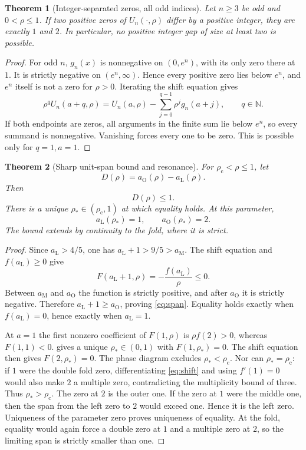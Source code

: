 \documentclass[11pt]{article}
\numberwithin{equation}{section}
\newtheorem{theorem}{Theorem}[section]
\theoremstyle{definition}
\newcommand{\N}{\mathbb N}
\newcommand{\lc}{\rho_{\mathrm c}}
\newcommand{\rs}{\rho_*}
\newcommand{\aL}{a_{\mathrm L}}
\newcommand{\aM}{a_{\mathrm M}}
\newcommand{\aO}{a_{\mathrm O}}
\begin{document}
\begin{theorem}[Integer-separated zeros, all odd indices]\label{thm:integergap}
Let $n\geq3$ be odd and $0<\rho\leq1$. If two positive zeros of
$U_n(\cdot,\rho)$ differ by a positive integer, they are exactly $1$ and $2$.
In particular, no positive integer gap of size at least two is possible.
\end{theorem}
\begin{proof}
For odd $n$, $g_n(x)$ is nonnegative on $(0,e^n)$, with its only zero there
at $1$. It is strictly negative on $(e^n,\infty)$. Hence every positive
zero lies below $e^n$, and $e^n$ itself is not a zero for $\rho>0$.
Iterating the shift equation gives
\[
 \rho^q U_n(a+q,\rho)=U_n(a,\rho)-
             \sum_{j=0}^{q-1}\rho^j g_n(a+j),\qquad q\in\N.
\]
If both endpoints are zeros, all arguments in the finite sum lie below
$e^n$, so every summand is nonnegative. Vanishing forces every one to be
zero. This is possible only for $q=1,a=1$.
\end{proof}

\begin{theorem}[Sharp unit-span bound and resonance]\label{thm:span}
For $\lc<\rho\leq1$, let
\[
 D(\rho)=\aO(\rho)-\aL(\rho).
\]
Then
\begin{equation}\label{eq:span}
 D(\rho)\leq1.
\end{equation}
There is a unique $\rs\in(\lc,1)$ at which equality holds. At this parameter,
\begin{equation}\label{eq:lockedzeros}
 \aL(\rs)=1,\qquad \aO(\rs)=2.
\end{equation}
The bound extends by continuity to the fold, where it is strict.
\end{theorem}
\begin{proof}
Since $\aL>4/5$, one has $\aL+1>9/5>\aM$.
The shift equation and $f(\aL)\geq0$ give
\[
 F(\aL+1,\rho)=-\frac{f(\aL)}{\rho}\leq0.
\]
Between $\aM$ and $\aO$ the function is strictly positive, and after
$\aO$ it is strictly negative. Therefore $\aL+1\geq\aO$, proving
\eqref{eq:span}. Equality holds exactly when $f(\aL)=0$, hence exactly
when $\aL=1$.

At $a=1$ the first nonzero coefficient of $F(1,\rho)$ is
$\rho f(2)>0$, whereas $F(1,1)<0$.  gives a unique
$\rs\in(0,1)$ with $F(1,\rs)=0$. The shift equation then gives
$F(2,\rs)=0$. The phase diagram excludes $\rs<\lc$.
Nor can $\rs=\lc$: if $1$ were the double fold zero, differentiating
\eqref{eq:shift} and using $f'(1)=0$ would also make $2$ a multiple zero,
contradicting the multiplicity bound of three. Thus $\rs>\lc$.
The zero at $2$ is the outer one. If the zero at $1$ were the middle one,
then the span from the left zero to $2$ would exceed one. Hence it is the
left zero. Uniqueness of the parameter zero proves uniqueness of equality.
At the fold, equality would again force a double zero at $1$ and a
multiple zero at $2$, so the limiting span is strictly smaller than one.
\end{proof}
\end{document}
